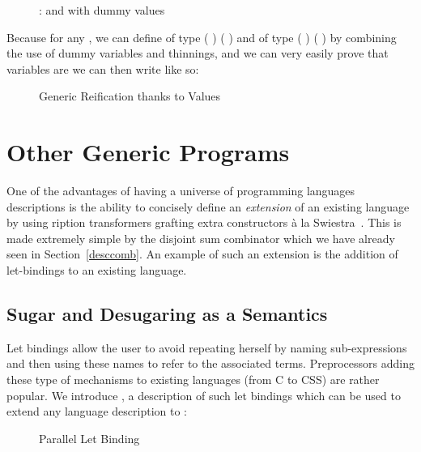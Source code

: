 \begin{figure}[h]
\caption{:  and with dummy values}
\end{figure}

Because for any  , we can define  of
type {( )  ( \AF{++} )} and  of
type {( )  ( \AF{++} )} by combining the use
of dummy variables and thinnings, and we can very easily prove that variables
are  we can then write  like so:

\begin{figure}[h]
\caption{Generic Reification thanks to  Values}
\end{figure}




\section{Other Generic Programs}

One of the advantages of having a universe of programming languages
descriptions is the ability to concisely define an \emph{extension}
of an existing language by using ription transformers
grafting extra constructors à la Swiestra~\citeyear{swierstra_2008}.
This is made extremely simple by the
disjoint sum combinator  which we have already seen
in Section~\ref{desccomb}.
An example of such an extension is the addition of let-bindings to
an existing language.

\subsection{Sugar and Desugaring as a Semantics}\label{section:letbinding}

Let bindings allow the user to avoid repeating herself by naming
sub-expressions and then using these names to refer to the associated
terms. Preprocessors adding these type of mechanisms to existing
languages (from C to CSS) are rather popular. We introduce ,
a description of such let bindings which can be used to extend any
language description  to   :

\begin{figure}[h]
\caption{Parallel Let Binding}
\end{figure}

